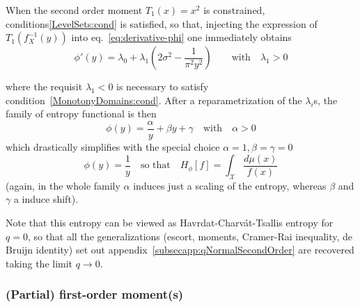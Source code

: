 \documentclass[entropy,article,submit,moreauthors,pdftex]{Definitions/mdpi}
\newcommand{\SZ}[1]{{\color{blue} #1}}                                       %
\def\X{\mathcal{X}}%
\begin{document}
When   the    second   order   moment    $T_1(x)   =   x^2$    is   constrained,
\SZ{conditions\ref{LevelSets:cond}   is  satisfied,   so  that,   injecting  the
  expression       of      $T_1\left(       f_X^{-1}(y)      \right)$       into
  eq.~\eqref{eq:derivative-phi}} one immediately obtains
%
\[
\phi'(y)=\lambda_0  + \lambda_1  \left(2 \sigma^2  - \frac{1}{\pi^2  y^2}\right)
\qquad \mbox{with} \quad \lambda_1 > 0
\]
%
\SZ{where    the   requisit    $\lambda_1   <0$    is   necessary    to   satisfy
  condition~\ref{MonotonyDomains:cond}.   After  a   reparametrization  of   the
  $\lambda_i$s, the family of entropy functional is then
%
\[
\phi(y)  = \frac{\alpha}{y} + \beta y + \gamma \quad \mbox{with}
  \quad \alpha > 0
\]
%
which drastically simplifies with the special choice $\alpha = 1, \beta = \gamma
= 0$
%
\[
\phi(y)  =   \frac{1}{y}  \quad  \mbox{so   that}  \quad  H_\phi[f]   =  \int_\X
\frac{d\mu(x)}{f(x)}
\]
%
(again, in  the whole  family $\alpha$  induces just a  scaling of  the entropy,
whereas $\beta$ and $\gamma$ a induce shift).

Note that this entropy can be viewed as Havrdat-Charv\'at-Tsallis entropy for $q
= 0$, so  that all the generalizations (escort,  moments, Cramer-Rai inequality,
de  Bruijn  identity)  set out  appendix~\ref{subsecapp:qNormalSecondOrder}  are
recovered taking the limit $q \to 0$.}


\subsubsection{(Partial) first-order moment(s)}
\label{subsubsecapp:ArcsineFirstPartial}
\end{document}
